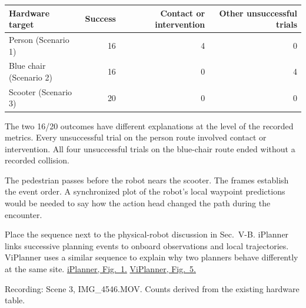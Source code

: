 \documentclass[10pt,letterpaper]{article}
\newcommand{\subhead}[1]{\par\vspace{3pt}{\large\bfseries #1}\par}
\newcommand{\source}[2]{{\small\color{slate}\href{#1}{#2}}}
\begin{document}
\vspace{3pt}
\begin{tabularx}{\linewidth}{@{}Xrrr@{}}
\toprule
Hardware target & Success & Contact or intervention & Other unsuccessful trials\\
\midrule
Person (Scenario 1) & 16 & 4 & 0\\
Blue chair (Scenario 2) & 16 & 0 & 4\\
Scooter (Scenario 3) & 20 & 0 & 0\\
\bottomrule
\end{tabularx}
\par\vspace{5pt}
The two 16/20 outcomes have different explanations at the level of the recorded metrics. Every unsuccessful trial on the person route involved contact or intervention. All four unsuccessful trials on the blue-chair route ended without a recorded collision.

\subhead{What the reader can see}
The pedestrian passes before the robot nears the scooter. The frames establish the event order. A synchronized plot of the robot's local waypoint predictions would be needed to say how the action head changed the path during the encounter.

\subhead{Where it fits}
Place the sequence next to the physical-robot discussion in Sec.~V-B. iPlanner links successive planning events to onboard observations and local trajectories. ViPlanner uses a similar sequence to explain why two planners behave differently at the same site. \source{https://www.roboticsproceedings.org/rss19/p064.pdf}{iPlanner, Fig.~1.} \source{https://arxiv.org/pdf/2310.00982}{ViPlanner, Fig.~5.}

\vfill
{\small\color{slate}Recording: Scene 3, IMG\_4546.MOV. Counts derived from the existing hardware table.}
\end{document}

